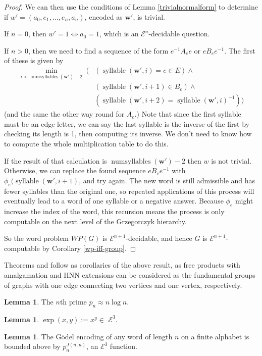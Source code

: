 \documentclass[a4paper]{article}
\newcommand{\grz}[1]{$\mathcal{E}^{#1}$}	%
\newcommand{\wvec}{\mathbf{w}}	%
\theoremstyle{plain}
\theoremstyle{definition}
\newtheorem{lemma}[theorem]{Lemma}
\begin{document}
\begin{proof}
We can then use the conditions of Lemma \ref{trivialnormalform} to determine if $w' = (a_0,e_1, \dots, e_n, a_n)$, encoded as $\wvec'$, is trivial.

If $n=0$, then $w'=1 \Leftrightarrow a_0=1$, which is an \grz{n}-decidable question.

If $n>0$, then we need to find a sequence of the form $e^{-1}A_ee$ or $eB_ee^{-1}$. The first of these is given by
\begin{equation}
\begin{split}
	\min_{i < \operatorname{numsyllables}(\wvec')-2} \; (&  (\operatorname{syllable}(\wvec',i) = e \in E) \wedge \\ 
	& ( \operatorname{syllable}(\wvec',i+1) \in B_e ) \wedge \\ 
	& ( \operatorname{syllable}(\wvec',i+2) = \operatorname{syllable}(\wvec',i)^{-1} ) )
\end{split} 
\end{equation}
(and the same the other way round for $A_e$.) Note that since the first syllable must be an edge letter, we can say the last syllable is the inverse of the first by checking its length is 1, then computing its inverse. We don't need to know how to compute the whole multiplication table to do this.

If the result of that calculation is $\operatorname{numsyllables}(\wvec')-2$ then $w$ is not trivial. Otherwise, we can replace the found sequence $eB_ee^{-1}$ with $\phi_e(\operatorname{syllable}(\wvec',i+1)$, and try again. The new word is still admissible and has fewer syllables than the original one, so repeated applications of this process will eventually lead to a word of one syllable or a negative answer. Because $\phi_e$ might increase the index of the word, this recursion means the process is only computable on the next level of the Grzegorczyk hierarchy.

So the word problem $WP(G)$ is \grz{n+1}-decidable, and hence $G$ is \grz{n+1}-computable by Corollary \ref{wp-iff-group}.
\end{proof}

Theorems \cite[4.6]{Cannonito_1973} and \cite[5.3]{Cannonito_1973} follow as corollaries of the above result, as free products with amalgamation and HNN extensions can be considered as the fundamental groups of graphs with one edge connecting two vertices and one vertex, respectively.

\begin{lemma}\label{primedist}
The $n$th prime $p_n \approx n \log n$.
\end{lemma}
\begin{lemma}\label{expine3}
$\exp(x,y) := x^y \in $ \grz{3}.
\end{lemma}
\begin{lemma}\label{godelbound}
The G\"odel encoding of any word of length $n$ on a finite alphabet is bounded above by $p_n^{J(n,n)}$, an \grz{3} function.
\end{lemma}
\end{document}
